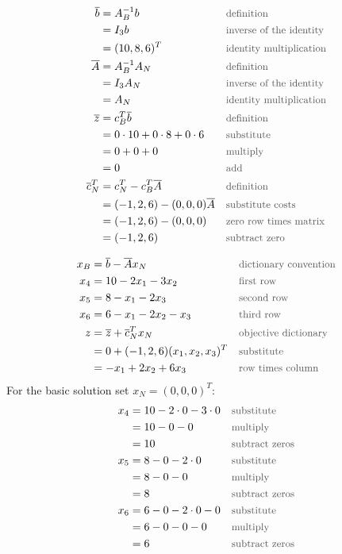 \documentclass[a4paper,11pt]{article}
\newif\ifexplain
\newcommand{\why}[1]{\text{\small\color{black!65}#1}}
\newcommand{\explain}[1]{\ifexplain\begin{erklbox}#1\end{erklbox}\fi}
\begin{document}
\begin{align*}
\overline b&=A_B^{-1}b&&\why{definition}\\
&=I_3b&&\why{inverse of the identity}\\
&=(10,8,6)^T&&\why{identity multiplication}\\
\overline A&=A_B^{-1}A_N&&\why{definition}\\
&=I_3A_N&&\why{inverse of the identity}\\
&=A_N&&\why{identity multiplication}\\
\overline z&=c_B^T\overline b&&\why{definition}\\
&=0\cdot10+0\cdot8+0\cdot6&&\why{substitute}\\
&=0+0+0&&\why{multiply}\\
&=0&&\why{add}\\
\overline c_N^T&=c_N^T-c_B^T\overline A&&\why{definition}\\
&=(-1,2,6)-(0,0,0)\overline A&&\why{substitute costs}\\
&=(-1,2,6)-(0,0,0)&&\why{zero row times matrix}\\
&=(-1,2,6)&&\why{subtract zero}
\end{align*}
\explain{Das Dictionary lautet $x_B=\overline b-\overline A x_N$. Die gespeicherte Matrix $\overline A$ trägt selbst kein zusätzliches Minuszeichen. Das Minus kommt erst in der Gleichung vor. Bei den reduzierten Kosten ziehen wir den Beitrag der Basisvariablen ab. Hier verschwindet er, weil deren Kosten alle null sind. Bei einer anderen Basis darf man diesen Term nicht weglassen.}
\begin{align*}
x_B&=\overline b-\overline A x_N&&\why{dictionary convention}\\
x_4&=10-2x_1-3x_2&&\why{first row}\\
x_5&=8-x_1-2x_3&&\why{second row}\\
x_6&=6-x_1-2x_2-x_3&&\why{third row}\\
z&=\overline z+\overline c_N^T x_N&&\why{objective dictionary}\\
&=0+(-1,2,6)(x_1,x_2,x_3)^T&&\why{substitute}\\
&=-x_1+2x_2+6x_3&&\why{row times column}
\end{align*}
For the basic solution set $x_N=(0,0,0)^T$:
\begin{align*}
x_4&=10-2\cdot0-3\cdot0&&\why{substitute}\\
&=10-0-0&&\why{multiply}\\
&=10&&\why{subtract zeros}\\
x_5&=8-0-2\cdot0&&\why{substitute}\\
&=8-0-0&&\why{multiply}\\
&=8&&\why{subtract zeros}\\
x_6&=6-0-2\cdot0-0&&\why{substitute}\\
&=6-0-0-0&&\why{multiply}\\
&=6&&\why{subtract zeros}
\end{align*}
\end{document}
